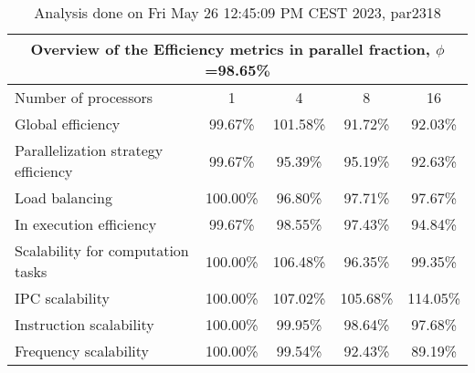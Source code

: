 \begin{table}[h]
\begin{center}
\begin{tabular}{|l|c|c|c|c|}
\hline
\multicolumn{5}{|c|}{Overview of the Efficiency metrics in parallel fraction, $\phi$=98.65\%} \\
\hline
\hline
Number of processors & 1 & 4 & 8 & 16 \\
\hline
\hline
Global efficiency                      &     99.67\% &    101.58\% &     91.72\% &     92.03\% \\
\hline
\hline
Parallelization strategy efficiency &     99.67\% &     95.39\% &     95.19\% &     92.63\% \\
\hline
Load balancing                   &    100.00\% &     96.80\% &     97.71\% &     97.67\% \\
In execution efficiency          &     99.67\% &     98.55\% &     97.43\% &     94.84\% \\
\hline
\hline
Scalability for computation tasks   &    100.00\% &    106.48\% &     96.35\% &     99.35\% \\
\hline
IPC scalability                  &    100.00\% &    107.02\% &    105.68\% &    114.05\% \\
Instruction scalability          &    100.00\% &     99.95\% &     98.64\% &     97.68\% \\
Frequency scalability            &    100.00\% &     99.54\% &     92.43\% &     89.19\% \\
\hline
\end{tabular}
\end{center}
\caption{ Analysis done on Fri May 26 12:45:09 PM CEST 2023, par2318}
\end{table}
